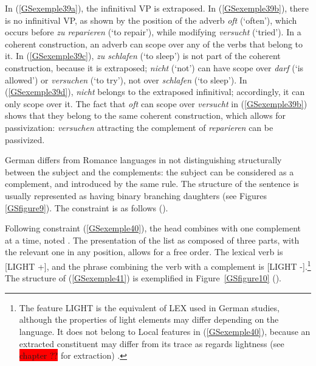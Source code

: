 \documentclass[output=paper
	        ,collection
	        ,collectionchapter
 	        ,biblatex
                ,babelshorthands
                ,newtxmath
                ,draftmode
                ,colorlinks, citecolor=brown
]{langscibook}
\begin{document}
{	\label{GSexemple39d}
\zl

In (\ref{GSexemple39a}), the infinitival VP is extraposed. In (\ref{GSexemple39b}), there is no infinitival VP, as shown by the position of the adverb \emph{oft} (`often'), which occurs before \emph{zu reparieren} (`to repair'), while modifying \emph{versucht} (`tried'). In a coherent construction, an adverb can scope over any of the verbs that belong to it. In (\ref{GSexemple39c}), \emph{zu schlafen} (`to sleep') is not part of the coherent construction, because it is extraposed; \emph{nicht} (`not') can have scope over \emph{darf} (`is allowed') or \emph{versuchen} (`to try'), not over \emph{schlafen} (`to sleep'). In (\ref{GSexemple39d}), \emph{nicht} belongs to the extraposed infinitival; accordingly, it can only scope over it. The fact that \emph{oft} can scope over \emph{versucht} in (\ref{GSexemple39b}) shows that they belong to the same coherent construction, which allows for passivization: \emph{versuchen} attracting the complement of \emph{reparieren} can be passivized.

German differs from Romance languages in not distinguishing structurally between the subject and the complements: the subject can be considered as a complement, and introduced by the same rule. The structure of the sentence is usually represented as having binary branching daughters (see Figures \ref{GSfigure9}). The constraint is as follows (\citealt[21]{muller2018clause}).

\begin{exe}
\end{exe}

Following constraint (\ref{GSexemple40}), the head combines with one complement at a time, noted . The presentation of the list as composed of three parts, with the relevant one in any position, allows for a free order. The lexical verb is [LIGHT +], and the phrase combining the verb with a complement is [LIGHT -].\footnote{The feature LIGHT is the equivalent of LEX used in German studies, although the properties of light elements may differ depending on the language. It does not belong to Local features in (\ref{GSexemple40}), because an extracted constituent may differ from its trace as regards lightness (see \colorbox{red}{chapter ??} for extraction) \citep{muller2018clause}.} The structure of (\ref{GSexemple41}) is exemplified in Figure~\ref{GSfigure10} (\citealt[22]{muller2018clause}).

}
\end{document}
